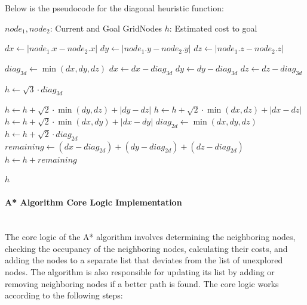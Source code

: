 \documentclass[12pt, a4paper]{article}
\begin{document}
Below is the pseudocode for the diagonal heuristic function:
\begin{singlespace}
\begin{algorithm}[H]
\caption{Diagonal Heuristic (3D)}
\label{alg:diagonal_heuristic}
\begin{algorithmic}[1] %
    \Require $node_1, node_2$: Current and Goal GridNodes
    \Ensure $h$: Estimated cost to goal
    
        \State $dx \gets |node_1.x - node_2.x|$
        \State $dy \gets |node_1.y - node_2.y|$
        \State $dz \gets |node_1.z - node_2.z|$
        
        \State {}
        \State $diag_{3d} \gets \min(dx, dy, dz)$
        \State $dx \gets dx - diag_{3d}$
        \State $dy \gets dy - diag_{3d}$
        \State $dz \gets dz - diag_{3d}$
        
        \State $h \gets \sqrt{3} \cdot diag_{3d}$
        
        \State {}
            \State $h \gets h + \sqrt{2} \cdot \min(dy, dz) + |dy - dz|$
            \State $h \gets h + \sqrt{2} \cdot \min(dx, dz) + |dx - dz|$
            \State $h \gets h + \sqrt{2} \cdot \min(dx, dy) + |dx - dy|$
        \Else
            \State {}
            \State $diag_{2d} \gets \min(dx, dy, dz)$
            \State $h \gets h + \sqrt{2} \cdot diag_{2d}$
            \State $remaining \gets (dx - diag_{2d}) + (dy - diag_{2d}) + (dz - diag_{2d})$
            \State $h \gets h + remaining$
        \EndIf
        
        \State \Return $h$
    \EndFunction
\end{algorithmic}
\end{algorithm} 
\end{singlespace}

\paragraph{A* Algorithm Core Logic Implementation} ~\\
The core logic of the A* algorithm involves determining the neighboring nodes,
checking the occupancy of the neighboring nodes, calculating their costs, and
adding the nodes to a separate list that deviates from the list of unexplored
nodes. The algorithm is also responsible for updating its list by adding or
removing neighboring nodes if a better path is found. The core logic works
according to the following steps:
\end{document}
